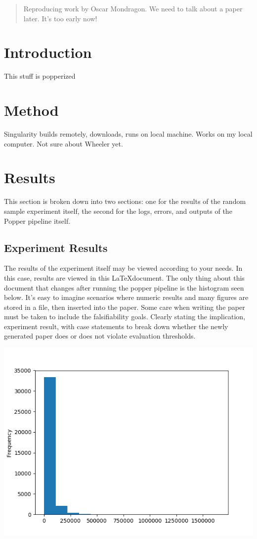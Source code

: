 \documentclass[12pt]{article}
\begin{document}
\maketitle

\begin{abstract}
Reproducing work by Oscar Mondragon. We need to talk about a paper later. It's too early now!
\end{abstract}

\section*{Introduction}
This stuff is popperized
\section*{Method}
Singularity builds remotely, downloads, runs on local machine. Works on my local computer. Not sure about Wheeler yet.
\section*{Results}
This section is broken down into two sections: one for the results of the random sample experiment itself,  the second for the logs, errors, and outputs of the Popper pipeline itself.
\subsection*{Experiment Results}
The results of the experiment itself may be viewed according to your needs. In this case, results are viewed in this \LaTeX document. The only thing about this document that changes after running the popper pipeline is the histogram seen below. It's easy to imagine scenarios where numeric results and many figures are stored in a file, then inserted into the paper. Some care when writing the paper must be taken to include the falsifiability goals. Clearly stating the implication, experiment result, with case statements to break down whether the newly generated paper does or does not violate evaluation thresholds.

\begin{center}
\includegraphics[scale=0.5]{../all_sample_hist.png} 
\end{center}
\end{document}
